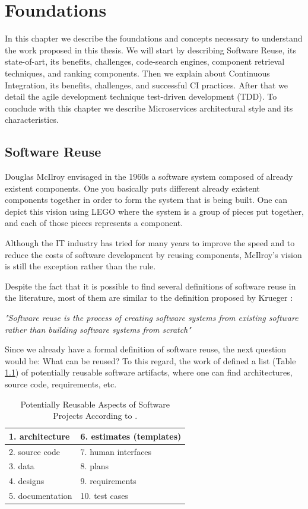 \chapter{Foundations}
\label{foundations}
In this chapter we describe the foundations and concepts necessary to understand the work proposed in this thesis. We will start by describing Software Reuse, its state-of-art, its benefits, challenges, code-search engines, component retrieval techniques, and ranking components. Then we explain about Continuous Integration, its benefits, challenges, and successful CI practices. After that we detail the agile development technique test-driven development (TDD). To conclude with this chapter we describe Microservices architectural style and its characteristics.
\section{Software Reuse}
\label{chap:sw-reuse}
Douglas McIlroy \cite{McIlroy1968} envisaged in the 1960s a software system composed of already existent components. One you basically puts different already existent components together in order to form the system that is being built. One can depict this vision using LEGO where the system is a group of pieces put together, and each of those pieces represents a component.

Although the IT industry has tried for many years to improve the speed and to reduce the costs of software development by reusing components, McIlroy's vision is still the exception rather than the rule.

Despite the fact that it is possible to find several definitions of software reuse in the literature, most of them are similar to the definition proposed by Krueger \cite{Krueger1992}:

\textit{"Software reuse is the process of creating software systems from existing software rather than building software systems from scratch"}

Since we already have a formal definition of software reuse, the next question would be: What can be reused? To this regard, the work of \citet{Frakes1996} defined a list (Table \ref{reusable-list}) of potentially reusable software artifacts, where one can find architectures, source code, requirements, etc.

\begin{table}[]
\centering
\label{reusable-list}
	\begin{tabular}{|l|l|}
		\hline
		1. architecture						 & 6. estimates (templates) \\ \hline
		2. source code  						 & 7. human interfaces      \\ \hline
		3. data                               & 8. plans                 \\ \hline
		4. designs                            & 9. requirements          \\ \hline
		5. documentation                      & 10. test cases           \\ \hline
	\end{tabular}
	\caption{Potentially Reusable Aspects of Software Projects According to \cite{Frakes1996}.}
\end{table}

